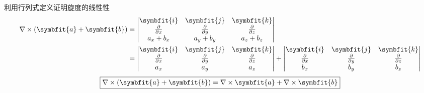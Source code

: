 \begin{myproof}

    利用行列式定义证明旋度的线性性
    \begin{equation}
        \begin{aligned}
            \nabla \times (\symbfit{a} + \symbfit{b}) & = \begin{vmatrix} \symbfit{i} & \symbfit{j} & \symbfit{k} \\ \frac{\partial}{\partial x} & \frac{\partial}{\partial y} & \frac{\partial}{\partial z} \\ a_x + b_x & a_y + b_y & a_z + b_z \end{vmatrix}                                                                                                                                                                     \\
                                                      & = \begin{vmatrix} \symbfit{i} & \symbfit{j} & \symbfit{k} \\ \frac{\partial}{\partial x} & \frac{\partial}{\partial y} & \frac{\partial}{\partial z} \\ a_x & a_y & a_z \end{vmatrix} + \begin{vmatrix} \symbfit{i} & \symbfit{j} & \symbfit{k} \\ \frac{\partial}{\partial x} & \frac{\partial}{\partial y} & \frac{\partial}{\partial z} \\ b_x & b_y & b_z \end{vmatrix}
        \end{aligned}
    \end{equation}
    \begin{equation}
        \boxed{\nabla \times (\symbfit{a} + \symbfit{b}) = \nabla \times \symbfit{a} + \nabla \times \symbfit{b}}
    \end{equation}



\end{myproof}
